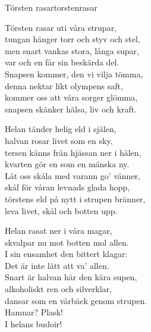 \begin{song}{Törsten rasar}{torstenrasar}

\begin{vers}
Törsten rasar uti våra strupar,\\
tungan hänger torr och styv och stel,\\
men snart vankas stora, långa supar,\\
var och en får sin beskärda del.\\
Snapsen kommer, den vi vilja tömma,\\
denna nektar likt olympens saft,\\
kommer oss att våra sorger glömma,\\
snapsen skänker hälsa, liv och kraft.\\
\end{vers}
\begin{vers}
Helan tänder helig eld i själen,\\
halvan rosar livet som en sky,\\
tersen känns från hjässan ner i hälen,\\
kvarten gör en som en mänska ny.\\
Låt oss skåla med varann go' vänner,\\
skål för våran levnads glada hopp,\\
törstens eld på nytt i strupen bränner,\\
leva livet, skål och botten upp.\\
\end{vers}

\newp

\begin{vers}
Helan rasat ner i våra magar,\\
skvalpar nu mot botten mol allen.\\
I sin ensamhet den bittert klagar:\\
Det är inte lätt att va' allen.\\
Snart är halvan här den kära supen,\\
alkoholiskt ren och silverklar,\\
dansar som en vårbäck genom strupen.\\
Hamnar? Plask!\\
I helans budoir!\\
\end{vers}
\end{song}




